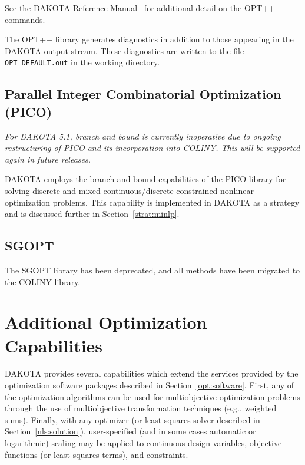See the DAKOTA Reference Manual~\cite{RefMan} for additional detail on the
OPT++ commands.

The OPT++ library generates diagnostics in addition to those appearing
in the DAKOTA output stream. These diagnostics are written to the file
\texttt{OPT\_DEFAULT.out} in the working directory.

\subsection{Parallel Integer Combinatorial Optimization (PICO)}\label{opt:software:pico}

\emph{For DAKOTA 5.1, branch and bound is currently inoperative due to 
ongoing restructuring of PICO and its incorporation into COLINY.
This will be supported again in future releases.}

DAKOTA employs the branch and bound capabilities of the PICO library
for solving discrete and mixed continuous/discrete constrained
nonlinear optimization problems. This capability is implemented in
DAKOTA as a strategy and is discussed further in
Section~\ref{strat:minlp}.

\subsection{SGOPT}\label{opt:software:sgopt}

The SGOPT library has been deprecated, and all methods have been
migrated to the COLINY library.

\section{Additional Optimization Capabilities}\label{opt:additional}

DAKOTA provides several capabilities which extend the services
provided by the optimization software packages described in
Section~\ref{opt:software}. First, any of the optimization algorithms
can be used for multiobjective optimization problems through the use
of multiobjective transformation techniques (e.g., weighted sums). 
Finally, with any optimizer (or least squares solver described in
Section~\ref{nls:solution}), user-specified (and in some cases
automatic or logarithmic) scaling may be applied to continuous design
variables, objective functions (or least squares terms), and constraints.

